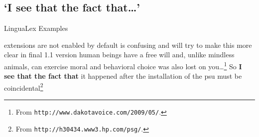 \documentclass[11pt]{article}
\begin{document}
\subsection{`I see that the fact that\ldots'}\label{subsecseethat} 

\begin{exe}
\ex LinguaLex Examples 
\begin{xlist}
 extensions are not enabled by default is confusing and will try to make this more clear in final 1.1 version
 human beings have a free will and, unlike mindless animals, can exercise moral and behavioral choice was also lost on you\ldots\footnote{From \texttt{http://www.dakotavoice.com/2009/05/}.}
\ex So {\bf I see that the fact that} it happened after the installation of the psu must be coincidental\footnote{From \texttt{http://h30434.www3.hp.com/psg/}.}
\end{xlist}
\end{exe}

\newpage
%




 
\end{document}
